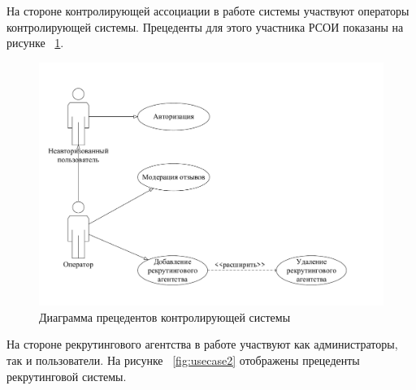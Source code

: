 На стороне контролирующей ассоциации в работе системы участвуют операторы контролирующей системы. Прецеденты для этого участника РСОИ показаны на рисунке ~\ref{fig:usecase1}.

\begin{figure}[ht]
  \centering
  \includegraphics[width=\textwidth]{include/usecase1.pdf}
  \caption{Диаграмма прецедентов контролирующей системы}
  \label{fig:usecase1}
\end{figure}

На стороне рекрутингового агентства в работе участвуют как администраторы, так и пользователи. На рисунке ~\ref{fig:usecase2} отображены прецеденты рекрутинговой системы.

